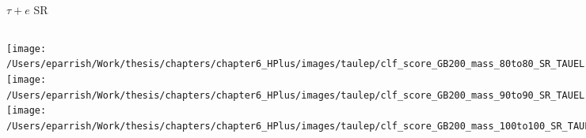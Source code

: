 \documentclass[aspectratio=169,xcolor=table]{beamer}
\begin{document}
    \begin{frame}[t]{$\tau+e$ SR}
      \begin{columns}[t]
          \texttt{[image: /Users/eparrish/Work/thesis/chapters/chapter6\_HPlus/images/taulep/clf\_score\_GB200\_mass\_80to80\_SR\_TAUEL.png]}
          \texttt{[image: /Users/eparrish/Work/thesis/chapters/chapter6\_HPlus/images/taulep/clf\_score\_GB200\_mass\_90to90\_SR\_TAUEL.png]}
          \texttt{[image: /Users/eparrish/Work/thesis/chapters/chapter6\_HPlus/images/taulep/clf\_score\_GB200\_mass\_100to100\_SR\_TAUEL.png]}

          \texttt{[image: /Users/eparrish/Work/thesis/chapters/chapter6\_HPlus/images/taulep/clf\_score\_GB200\_mass\_110to110\_SR\_TAUEL.png]}
          \texttt{[image: /Users/eparrish/Work/thesis/chapters/chapter6\_HPlus/images/taulep/clf\_score\_GB200\_mass\_120to120\_SR\_TAUEL.png]}
          \texttt{[image: /Users/eparrish/Work/thesis/chapters/chapter6\_HPlus/images/taulep/clf\_score\_GB200\_mass\_130to130\_SR\_TAUEL.png]}
          \texttt{[image: /Users/eparrish/Work/thesis/chapters/chapter6\_HPlus/images/taulep/clf\_score\_GB200\_mass\_140to140\_SR\_TAUEL.png]}
          \texttt{[image: /Users/eparrish/Work/thesis/chapters/chapter6\_HPlus/images/taulep/clf\_score\_GB200\_mass\_150to150\_SR\_TAUEL.png]}
          \texttt{[image: /Users/eparrish/Work/thesis/chapters/chapter6\_HPlus/images/taulep/clf\_score\_GB200\_mass\_160to160\_SR\_TAUEL.png]}

          \texttt{[image: /Users/eparrish/Work/thesis/chapters/chapter6\_HPlus/images/taulep/clf\_score\_GB200\_mass\_170to170\_SR\_TAUEL.png]}
          \texttt{[image: /Users/eparrish/Work/thesis/chapters/chapter6\_HPlus/images/taulep/clf\_score\_GB200\_mass\_180to180\_SR\_TAUEL.png]}
          \texttt{[image: /Users/eparrish/Work/thesis/chapters/chapter6\_HPlus/images/taulep/clf\_score\_GB200\_mass\_190to190\_SR\_TAUEL.png]}

      \end{columns}
    \end{frame}
\end{document}
